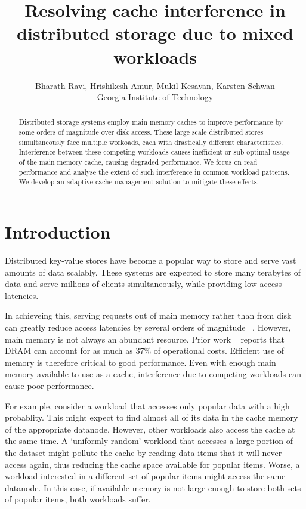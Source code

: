 \documentclass[twocolumn]{article}
\begin{document}
\begin{multicols}{2}
\title{\textbf{Resolving cache interference in distributed storage due to mixed workloads}}
\author{
    Bharath Ravi, Hrishikesh Amur, Mukil Kesavan, Karsten Schwan\\
    \normalsize Georgia Institute of Technology
}
\maketitle
\end{multicols}
\begin{abstract}
Distributed storage systems employ main memory caches to improve performance by some orders of magnitude over disk access. These large scale distributed stores simultaneously face multiple workoads, each with drastically different characteristics. Interference between these competing workloads causes inefficient or sub-optimal usage of the main memory cache, causing degraded performance. We focus on read performance and analyse the extent of such interference in common workload patterns. We develop an adaptive cache management solution to mitigate these effects.
\end{abstract}

\section{Introduction}
Distributed key-value stores have become a popular way to store and serve vast amounts of data scalably. These systems are expected to store many terabytes of data and serve millions of clients simultaneously, while providing low access latencies.

In achieveing this, serving requests out of main memory rather than from disk can greatly reduce access latencies by several orders of magnitude ~\cite{Ousterhout:2011:CR:1965724.1965751}. However, main memory is not always an abundant resource. Prior work ~\cite{Zhu:2012:SCU:2342763.2342766} reports that DRAM can account for as much as 37\% of operational costs. Efficient use of memory is therefore critical to good performance. Even with enough main memory available to use as a cache, interference due to competing workloads can cause poor performance. 

For example, consider a workload that accesses only popular data with a high probablity. This might expect to find almost all of its data in the cache memory of the appropriate datanode. However, other workloads also access the cache at the same time. A `uniformly random' workload that accesses a large portion of the dataset might pollute the cache by reading data items that it will never access again, thus reducing the cache space available for popular items. Worse, a workload interested in a different set of popular items might access the same datanode. In this case, if available memory is not large enough to store both sets of popular items, both workloads suffer.
\end{document}
